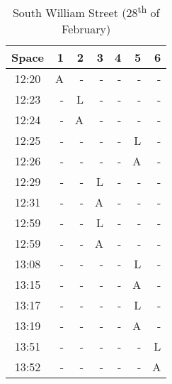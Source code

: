 \begin{table}[H]
\begin{minipage}{0.48\textwidth}
\begin{tabular}{|c|r|r|r|r|r|r|}
            \hline
            Space & 1 & 2 & 3 & 4 & 5 & 6 \\
            \hline\hline
            12:20 & A & - & - & - & - & - \\ \hline
            12:23 & - & L & - & - & - & - \\ \hline
            12:24 & - & A & - & - & - & - \\ \hline
            12:25 & - & - & - & - & L & - \\ \hline
            12:26 & - & - & - & - & A & - \\ \hline
            12:29 & - & - & L & - & - & - \\ \hline
            12:31 & - & - & A & - & - & - \\ \hline
            12:59 & - & - & L & - & - & - \\ \hline
            12:59 & - & - & A & - & - & - \\ \hline
            13:08 & - & - & - & - & L & - \\ \hline
            13:15 & - & - & - & - & A & - \\ \hline
            13:17 & - & - & - & - & L & - \\ \hline
            13:19 & - & - & - & - & A & - \\ \hline
            13:51 & - & - & - & - & - & L \\ \hline
            13:52 & - & - & - & - & - & A \\
            \hline
    \end{tabular}
    \caption{South William Street (28\textsuperscript{th} of February)}
    \label{table:southWilliamStreet} 
    \end{minipage}
\end{table}